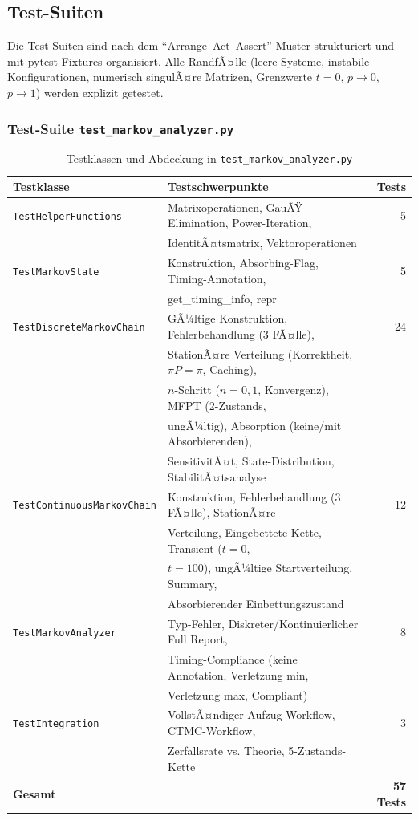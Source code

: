 ﻿\documentclass[a4paper,12pt]{scrreprt}
\theoremstyle{definition}
\begin{document}
\subsection{Test-Suiten}
\label{sec:tests-impl}

Die Test-Suiten sind nach dem ``Arrange--Act--Assert''-Muster strukturiert
und mit pytest-Fixtures organisiert. Alle RandfÃ¤lle (leere Systeme,
instabile Konfigurationen, numerisch singulÃ¤re Matrizen, Grenzwerte $t=0$,
$p \to 0$, $p \to 1$) werden explizit getestet.

\subsubsection{Test-Suite \texttt{test\_markov\_analyzer.py}}

\begin{table}
	\centering
	\begin{tabular}{@{}llr@{}}
		\toprule
		\textbf{Testklasse} & \textbf{Testschwerpunkte} & \textbf{Tests} \\
		\midrule
		\texttt{TestHelperFunctions} & Matrixoperationen, GauÃŸ-Elimination,
		Power-Iteration, & 5 \\
		& IdentitÃ¤tsmatrix, Vektoroperationen & \\
		\texttt{TestMarkovState} & Konstruktion, Absorbing-Flag,
		Timing-Annotation, & 5 \\
		& get\_timing\_info, repr & \\
		\texttt{TestDiscreteMarkovChain} & GÃ¼ltige Konstruktion, Fehlerbehandlung
		(3 FÃ¤lle), & 24 \\
		& StationÃ¤re Verteilung (Korrektheit, $\pi P=\pi$, Caching), & \\
		& $n$-Schritt ($n=0,1$, Konvergenz), MFPT (2-Zustands, & \\
		& ungÃ¼ltig), Absorption (keine/mit Absorbierenden), & \\
		& SensitivitÃ¤t, State-Distribution, StabilitÃ¤tsanalyse & \\
		\texttt{TestContinuousMarkovChain} & Konstruktion, Fehlerbehandlung
		(3 FÃ¤lle), StationÃ¤re & 12 \\
		& Verteilung, Eingebettete Kette, Transient ($t=0$, & \\
		& $t=100$), ungÃ¼ltige Startverteilung, Summary, & \\
		& Absorbierender Einbettungszustand & \\
		\texttt{TestMarkovAnalyzer} & Typ-Fehler, Diskreter/Kontinuierlicher
		Full Report, & 8 \\
		& Timing-Compliance (keine Annotation, Verletzung min, & \\
		& Verletzung max, Compliant) & \\
		\texttt{TestIntegration} & VollstÃ¤ndiger Aufzug-Workflow, CTMC-Workflow, & 3 \\
		& Zerfallsrate vs. Theorie, 5-Zustands-Kette & \\
		\midrule
		\textbf{Gesamt} & & \textbf{57 Tests} \\
		\bottomrule
	\end{tabular}
	\caption{Testklassen und Abdeckung in \texttt{test\_markov\_analyzer.py}}
	\label{tab:tests-markov}
\end{table}
\end{document}
